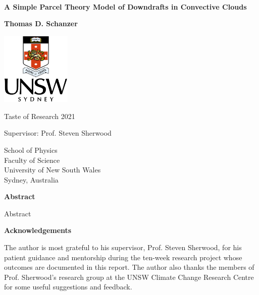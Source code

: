 \documentclass[12pt,titlepage]{article}
\begin{document}
% 

\begin{titlepage}
    \begin{center}
        ~

        \vspace{3cm}
        \Huge
        \textbf{%
        	A Simple Parcel Theory Model of Downdrafts in Convective Clouds}
        
        \vspace{0.75cm}
        \Large
        \textbf{Thomas D. Schanzer}
            
        \vfill
            
        \includegraphics[width=0.25\textwidth]{figures/unsw}

        \vspace{1cm}

        \large    
        Taste of Research 2021

        Supervisor: Prof. Steven Sherwood

        \vspace{1cm}
            
        \large
        School of Physics\\
        Faculty of Science\\
        University of New South Wales\\
        Sydney, Australia\\
    \end{center}
\end{titlepage}

\begin{center}
	\large
	\textbf{Abstract}
\end{center}

Abstract

\begin{center}
	\large
	\textbf{Acknowledgements}
\end{center}

The author is most grateful to his supervisor, Prof. Steven Sherwood, for
his patient guidance and mentorship during the ten-week research project
whose outcomes are documented in this report. The author also thanks
the members of Prof. Sherwood's research group at the UNSW Climate
Change Research Centre for some useful suggestions and feedback.
\end{document}
